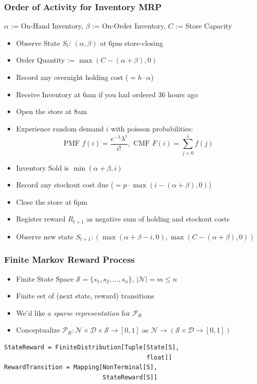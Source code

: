\documentclass[handout]{beamer}
\begin{document}
\begin{frame}
\frametitle{Order of Activity for Inventory MRP}
\pause
$\alpha$ := On-Hand Inventory, $\beta$ := On-Order Inventory, $C$ := Store Capacity
\pause
\begin{itemize}[<+->]
\item Observe State $S_t$: $(\alpha, \beta)$ at 6pm store-closing
\item Order Quantity := $\max(C - (\alpha + \beta), 0)$
\item Record any overnight holding cost ($=h \cdot \alpha$)
\item Receive Inventory at 6am if you had ordered 36 hours ago
\item Open the store at 8am
\item Experience random demand $i$ with poisson probabilities:
$$\text{PMF } f(i) = \frac {e^{-\lambda} \lambda^i} {i!}, \text{ CMF } F(i) = \sum_{j=0}^i f(j)$$
\item Inventory Sold is $\min(\alpha + \beta, i)$
\item Record any stockout cost due ($=p\cdot \max(i - (\alpha + \beta), 0)$)
\item Close the store at 6pm
\item Register reward $R_{t+1}$ as negative sum of holding and stockout costs
\item Observe new state $S_{t+1}: (\max(\alpha + \beta - i, 0), \max(C - (\alpha + \beta), 0))$
\end{itemize}
\end{frame}

\begin{frame}[fragile]
\frametitle{Finite Markov Reward Process}
\pause
\begin{itemize}[<+->]
\item Finite State Space $\mathcal{S} = \{s_1, s_2, \ldots, s_n\}$, $|\mathcal{N}| = m\leq n$
\item Finite set of (next state, reward) transitions
\item We'd like a {\em sparse representation} for $\mathcal{P}_R$
\item Conceptualize $\mathcal{P}_R : \mathcal{N} \times \mathcal{D} \times \mathcal{S} \rightarrow [0, 1]$ as $\mathcal{N} \rightarrow (\mathcal{S} \times \mathcal{D} \rightarrow [0, 1])$
\end{itemize}
\pause
\begin{lstlisting}
StateReward = FiniteDistribution[Tuple[State[S],
                                       float]]
RewardTransition = Mapping[NonTerminal[S],
                           StateReward[S]]
\end{lstlisting}
\end{frame}
\end{document}
